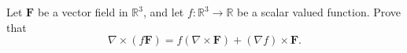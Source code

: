 \begin{problem}
Let $\mathbf{F}$ be a vector field in $\mathbb{R}^3$, and let $f:\mathbb{R}^3\rightarrow\mathbb{R}$ be a scalar valued function. Prove that
\[
\nabla\times (f\mathbf{F}) = f(\nabla\times\mathbf{F})+(\nabla f)\times \mathbf{F}.
\]
\end{problem}